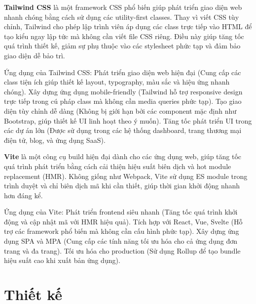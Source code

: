 \documentclass[a4paper]{article}
\begin{document}
\textbf{Tailwind CSS} là một framework CSS phổ biến giúp phát triển giao diện web nhanh chóng bằng cách sử dụng các utility-first classes. Thay vì viết CSS tùy chỉnh, Tailwind cho phép lập trình viên áp dụng các class trực tiếp vào HTML để tạo kiểu ngay lập tức mà không cần viết file CSS riêng. Điều này giúp tăng tốc quá trình thiết kế, giảm sự phụ thuộc vào các stylesheet phức tạp và đảm bảo giao diện dễ bảo trì.

Ứng dụng của Tailwind CSS: 
Phát triển giao diện web hiện đại (Cung cấp các class tiện ích giúp thiết kế layout, typography, màu sắc và hiệu ứng nhanh chóng).
Xây dựng ứng dụng mobile-friendly (Tailwind hỗ trợ responsive design trực tiếp trong cú pháp class mà không cần media queries phức tạp).
Tạo giao diện tùy chỉnh dễ dàng (Không bị giới hạn bởi các component mặc định như Bootstrap, giúp thiết kế UI linh hoạt theo ý muốn).
Tăng tốc phát triển UI trong các dự án lớn (Được sử dụng trong các hệ thống dashboard, trang thương mại điện tử, blog, và ứng dụng SaaS).

\textbf{Vite} là một công cụ build hiện đại dành cho các ứng dụng web, giúp tăng tốc quá trình phát triển bằng cách cải thiện hiệu suất biên dịch và hot module replacement (HMR). Không giống như Webpack, Vite sử dụng ES module trong trình duyệt và chỉ biên dịch mã khi cần thiết, giúp thời gian khởi động nhanh hơn đáng kể.

Ứng dụng của Vite: 
Phát triển frontend siêu nhanh (Tăng tốc quá trình khởi động và cập nhật mã với HMR hiệu quả).
Tích hợp với React, Vue, Svelte (Hỗ trợ các framework phổ biến mà không cần cấu hình phức tạp).
Xây dựng ứng dụng SPA và MPA (Cung cấp các tính năng tối ưu hóa cho cả ứng dụng đơn trang và đa trang).
Tối ưu hóa cho production (Sử dụng Rollup để tạo bundle hiệu suất cao khi xuất bản ứng dụng).

\section{Thiết kế}
\end{document}
